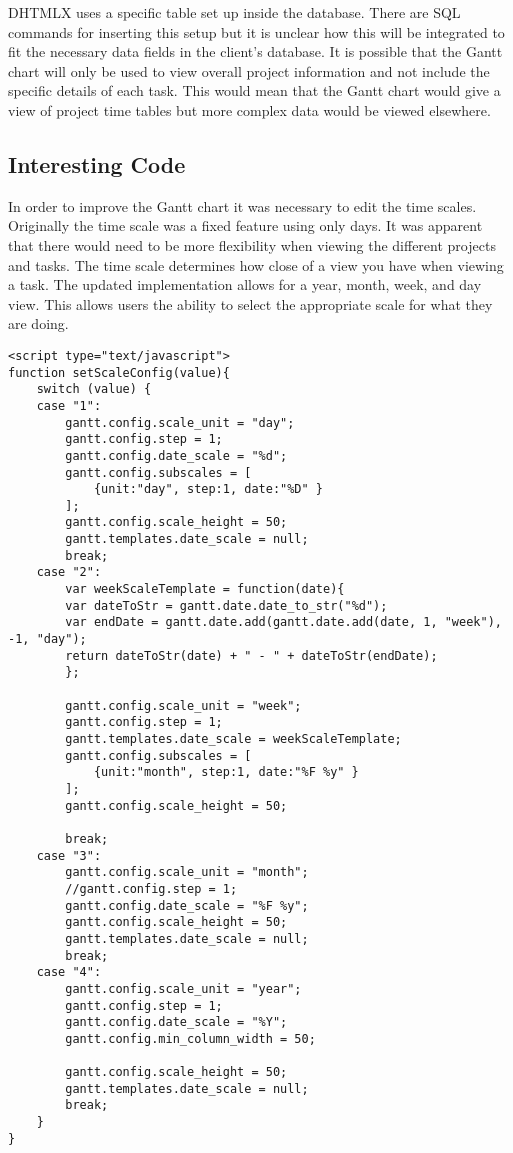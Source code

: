 \documentclass[letterpaper,10pt,titlepage,journal,compsoc,draftclsnofoot,onecolumn]{IEEEtran}
\newcommand\tab[1][1cm]{\hspace*{#1}}
\begin{document}
\tab
DHTMLX uses a specific table set up inside the database. There are SQL commands for inserting this setup but it is unclear how this will be integrated to fit the necessary data fields in the client’s database. It is possible that the Gantt chart will only be used to view overall project information and not include the specific details of each task. This would mean that the Gantt chart would give a view of project time tables but more complex data would be viewed elsewhere.
\newline

\subsection{Interesting Code}

\tab
In order to improve the Gantt chart it was necessary to edit the time scales. Originally the time scale was a fixed feature using only days. It was apparent that there would need to be more flexibility when viewing the different projects and tasks. The time scale determines how close of a view you have when viewing a task. The updated implementation allows for a year, month, week, and day view. This allows users the ability to select the appropriate scale for what they are doing.
\newline

\lstset{language=PHP, showstringspaces=false}
\begin{lstlisting}
<script type="text/javascript">
function setScaleConfig(value){
	switch (value) {
	case "1":
		gantt.config.scale_unit = "day";
		gantt.config.step = 1;
		gantt.config.date_scale = "%d";
		gantt.config.subscales = [
			{unit:"day", step:1, date:"%D" }
		];
		gantt.config.scale_height = 50;
		gantt.templates.date_scale = null;
		break;
	case "2":
		var weekScaleTemplate = function(date){
		var dateToStr = gantt.date.date_to_str("%d");
		var endDate = gantt.date.add(gantt.date.add(date, 1, "week"), -1, "day");
		return dateToStr(date) + " - " + dateToStr(endDate);
		};

		gantt.config.scale_unit = "week";
		gantt.config.step = 1;
		gantt.templates.date_scale = weekScaleTemplate;
		gantt.config.subscales = [
			{unit:"month", step:1, date:"%F %y" }
		];
		gantt.config.scale_height = 50;
		
		break;
	case "3":
		gantt.config.scale_unit = "month";
		//gantt.config.step = 1;
		gantt.config.date_scale = "%F %y";
		gantt.config.scale_height = 50;
		gantt.templates.date_scale = null;
		break;
	case "4":
		gantt.config.scale_unit = "year";
		gantt.config.step = 1;
		gantt.config.date_scale = "%Y";
		gantt.config.min_column_width = 50;

		gantt.config.scale_height = 50;
		gantt.templates.date_scale = null;
		break;
	}
}

\end{lstlisting}
\end{document}
